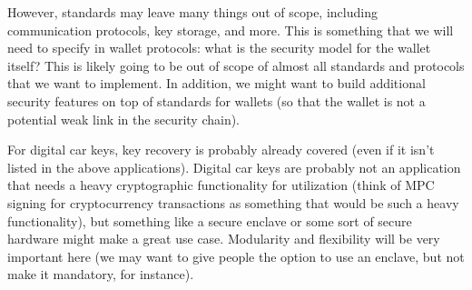 However, standards may leave many things out of scope, including communication protocols, key storage, and more.  This is something that we will need to specify in wallet protocols:  what is the security model for the wallet itself?  This is likely going to be out of scope of almost all standards and protocols that we want to implement.  In addition, we might want to build additional security features on top of standards for wallets (so that the wallet is not a potential weak link in the security chain).

For digital car keys, key recovery is probably already covered (even if it isn't listed in the above applications).  Digital car keys are probably not an application that needs a heavy cryptographic functionality for utilization (think of MPC signing for cryptocurrency transactions as something that would be such a heavy functionality), but something like a secure enclave or some sort of secure hardware might make a great use case.  Modularity and flexibility will be very important here (we may want to give people the option to use an enclave, but not make it mandatory, for instance).

